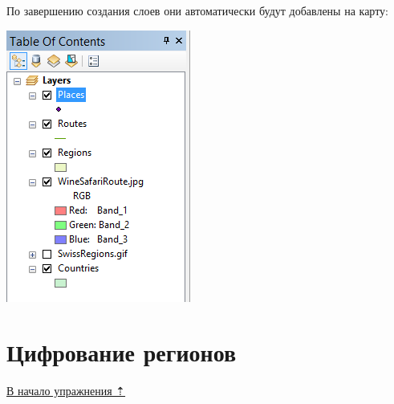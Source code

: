 \documentclass[]{book}
\theoremstyle{definition}
\theoremstyle{definition}
\theoremstyle{definition}
\theoremstyle{remark}
\begin{document}
По завершению создания слоев они автоматически будут добавлены на карту:

\includegraphics{images/Ex07/image14.png}

\hypertarget{map-ref-general-digitizing}{%
\section{Цифрование регионов}\label{map-ref-general-digitizing}}

\protect\hyperlink{map-ref-general}{В начало упражнения ⇡}
\end{document}
